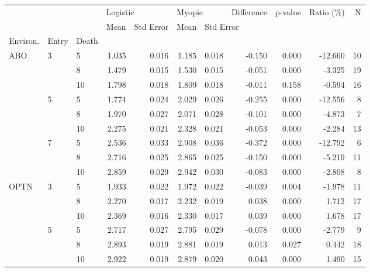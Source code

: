 \begin{tabular}{lllrrrrrrrr}
\toprule
    &   &    & \multicolumn{2}{l}{Logistic} & \multicolumn{2}{l}{Myopic} & Difference & p-value & Ratio (\%) &   N \\
    &   &    &     Mean & Std Error &   Mean & \multicolumn{5}{l}{Std Error} \\
Environ. & Entry & Death &          &           &        &           &            &         &           &     \\
\midrule
ABO & 3 & 5  &    1.035 &     0.016 &  1.185 &     0.018 &     -0.150 &   0.000 &   -12.660 &  10 \\
    &   & 8  &    1.479 &     0.015 &  1.530 &     0.015 &     -0.051 &   0.000 &    -3.325 &  19 \\
    &   & 10 &    1.798 &     0.018 &  1.809 &     0.018 &     -0.011 &   0.158 &    -0.594 &  16 \\
    & 5 & 5  &    1.774 &     0.024 &  2.029 &     0.026 &     -0.255 &   0.000 &   -12.556 &   8 \\
    &   & 8  &    1.970 &     0.027 &  2.071 &     0.028 &     -0.101 &   0.000 &    -4.873 &   7 \\
    &   & 10 &    2.275 &     0.021 &  2.328 &     0.021 &     -0.053 &   0.000 &    -2.284 &  13 \\
    & 7 & 5  &    2.536 &     0.033 &  2.908 &     0.036 &     -0.372 &   0.000 &   -12.792 &   6 \\
    &   & 8  &    2.716 &     0.025 &  2.865 &     0.025 &     -0.150 &   0.000 &    -5.219 &  11 \\
    &   & 10 &    2.859 &     0.029 &  2.942 &     0.030 &     -0.083 &   0.000 &    -2.808 &   8 \\
OPTN & 3 & 5  &    1.933 &     0.022 &  1.972 &     0.022 &     -0.039 &   0.004 &    -1.978 &  11 \\
    &   & 8  &    2.270 &     0.017 &  2.232 &     0.019 &      0.038 &   0.000 &     1.712 &  17 \\
    &   & 10 &    2.369 &     0.016 &  2.330 &     0.017 &      0.039 &   0.000 &     1.678 &  17 \\
    & 5 & 5  &    2.717 &     0.027 &  2.795 &     0.029 &     -0.078 &   0.000 &    -2.779 &   9 \\
    &   & 8  &    2.893 &     0.019 &  2.881 &     0.019 &      0.013 &   0.027 &     0.442 &  18 \\
    &   & 10 &    2.922 &     0.019 &  2.879 &     0.020 &      0.043 &   0.000 &     1.490 &  15 \\

\end{tabular}
